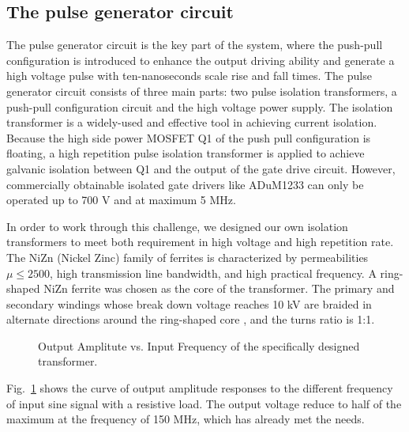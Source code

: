 \documentclass[aip,rsi,reprint,graphicx]{revtex4-1} %
\begin{document}
\subsection{The pulse generator circuit}
The pulse generator circuit is the key part of the system, where the push-pull configuration is introduced to enhance the output driving ability and generate a high voltage pulse with ten-nanoseconds scale rise and fall times.
The pulse generator circuit consists of three main parts: two pulse isolation transformers, a push-pull configuration circuit and the high voltage power supply.
 The isolation transformer is a widely-used and effective tool in achieving current isolation.
 Because the high side power MOSFET Q1 of the push pull configuration is floating, a high repetition pulse isolation transformer is applied to achieve galvanic isolation between Q1 and the output of the gate drive circuit.
 However, commercially obtainable isolated gate drivers like ADuM1233 can only be operated up to 700 V and at maximum 5 MHz.

 In order to work through this challenge, we designed our own isolation transformers to meet both requirement in high voltage and high repetition rate.
 The NiZn (Nickel Zinc) family of ferrites is characterized by permeabilities $\mu\le2500$,  high transmission line bandwidth, and high practical frequency.%
 A ring-shaped NiZn ferrite was chosen as the core of the transformer.
 The primary and secondary windings whose break down voltage reaches 10 kV are braided in alternate directions around the ring-shaped core %
, and the turns ratio is 1:1.

\begin{figure}[hbt]
{}
  \caption{Output Amplitute vs. Input Frequency of the specifically designed transformer.\label{FIG8}}
\end{figure}

 Fig.~\ref{FIG8} shows the curve of output amplitude responses to the different frequency of input sine signal with a resistive load.
 The output voltage reduce to half of the maximum at the frequency of 150 MHz, which has already met the needs.

\end{document}
